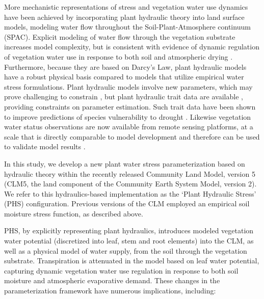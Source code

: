 \documentclass[draft,linenumbers]{agujournal}
\begin{document}
More mechanistic representations of stress and vegetation water use dynamics have been achieved by incorporating plant hydraulic theory into land surface models, modeling water flow throughout the Soil-Plant-Atmosphere continuum (SPAC)\citep{xu2016,christoffersen2016,sperry2017}.
Explicit modeling of water flow through the vegetation substrate increases model complexity, but is consistent with evidence of dynamic regulation of vegetation water use in response to both soil and atmospheric drying \citep{tardieu1998,sperry1998,sperry2015}.
Furthermore, because they are based on Darcy's Law, plant hydraulic models have a robust physical basis compared to models that utilize empirical water stress formulations.
Plant hydraulic models involve new parameters, which may prove challenging to constrain \citep{drake2017}, but plant hydraulic trait data are available \citep{kattge2011,anderegg2015a}, providing constraints on parameter estimation.   
Such trait data have been shown to improve predictions of species vulnerability to drought \citep{choat2012,mackay2015,powell2018,giardina2018}.
Likewise vegetation water status observations are now available from remote sensing platforms, at a scale that is directly comparable to model development \citep{konings2016,grant2016} and therefore can be used to validate model results \citep{momen2017,konings2017b}.

In this study, we develop a new plant water stress parameterization based on hydraulic theory within the recently released Community Land Model, version 5 (CLM5, the land component of the Community Earth System Model, version 2). 
We refer to this hydraulics-based implementation as the `Plant Hydraulic Stress' (PHS) configuration. 
Previous versions of the CLM employed an empirical soil moisture stress function, as described above.

PHS, by explicitly representing plant hydraulics, introduces modeled vegetation water potential (discretized into leaf, stem and root elements) into the CLM, as well as a physical model of water supply, from the soil through the vegetation substrate. 
Transpiration is attenuated in the model based on leaf water potential, capturing dynamic vegetation water use regulation in response to both soil moisture and atmospheric evaporative demand. 
These changes in the parameterization framework have numerous implications, including: 
\end{document}
